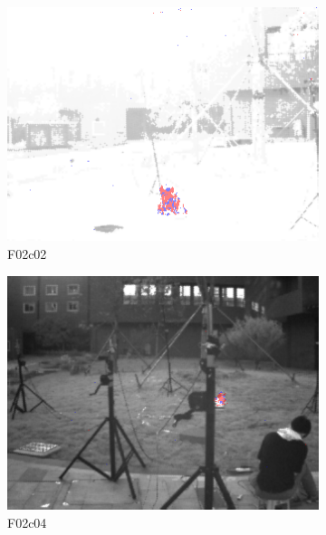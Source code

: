 \begin{figure}[ht]
\begin{subfigure}{0.32\textwidth}
        \centering
        \includegraphics[width=\textwidth]{figures/FlaDE_03.png}
        \caption{F02\textunderscore c02}
        \label{subfig:FlaDE_03}
    \end{subfigure}
    \begin{subfigure}{0.32\textwidth}
        \centering
        \includegraphics[width=\textwidth]{figures/FlaDE_04.png}
        \caption{F02\textunderscore c04}
        \label{subfig:FlaDE_04}
    \end{subfigure}
    \hfill
    \begin{subfigure}{0.32\textwidth}
        \centering

\end{subfigure}
\end{figure}
